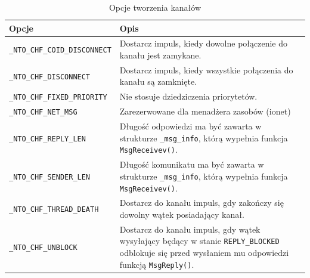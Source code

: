 \begin{table}[h!]
\centering
\caption{Opcje tworzenia kanałów}
\setlength{\arrayrulewidth}{1pt}
\setlength{\tabcolsep}{6pt}
\renewcommand{\arraystretch}{1.2}
\begin{tabular}{ |p{}|p{}|}
\hline \rowcolor{gray}
\textbf{Opcje} & \textbf{Opis} \\ \hline
\mbox{\lstinline[style=MyCStyle]{_NTO_CHF_COID_DISCONNECT}} & Dostarcz impuls, kiedy dowolne połączenie do kanału jest zamykane. \\ \hline
\mbox{\lstinline[style=MyCStyle]{_NTO_CHF_DISCONNECT}} & Dostarcz impuls, kiedy wszystkie połączenia do kanału są zamknięte.  \\ \hline
\mbox{\lstinline[style=MyCStyle]{_NTO_CHF_FIXED_PRIORITY}} & Nie stosuje dziedziczenia priorytetów. \\ \hline
\mbox{\lstinline[style=MyCStyle]{_NTO_CHF_NET_MSG}} & Zarezerwowane dla menadżera zasobów (ionet) \\ \hline
\mbox{\lstinline[style=MyCStyle]{_NTO_CHF_REPLY_LEN}} & Długość odpowiedzi ma być zawarta w strukturze \mbox{\lstinline[style=MyCStyle]{_msg_info}}, którą wypełnia funkcja \mbox{\lstinline[style=MyCStyle]{MsgReceivev()}}. \\ \hline
\mbox{\lstinline[style=MyCStyle]{_NTO_CHF_SENDER_LEN}} & Długość komunikatu ma być zawarta w strukturze \mbox{\lstinline[style=MyCStyle]{_msg_info}}, którą wypełnia funkcja \mbox{\lstinline[style=MyCStyle]{MsgReceivev()}}. \\ \hline
\mbox{\lstinline[style=MyCStyle]{_NTO_CHF_THREAD_DEATH}} & Dostarcz do kanału impuls, gdy zakończy się dowolny wątek posiadający kanał. \\ \hline
\mbox{\lstinline[style=MyCStyle]{_NTO_CHF_UNBLOCK}} & Dostarcz do kanału impuls, gdy wątek wysyłający będący w stanie \mbox{\lstinline[style=MyCStyle]{REPLY_BLOCKED}} odblokuje się przed wysłaniem mu odpowiedzi funkcją \mbox{\lstinline[style=MyCStyle]{MsgReply()}}.  \\ \hline
\end{tabular}
\label{tab:flags}
\end{table}

